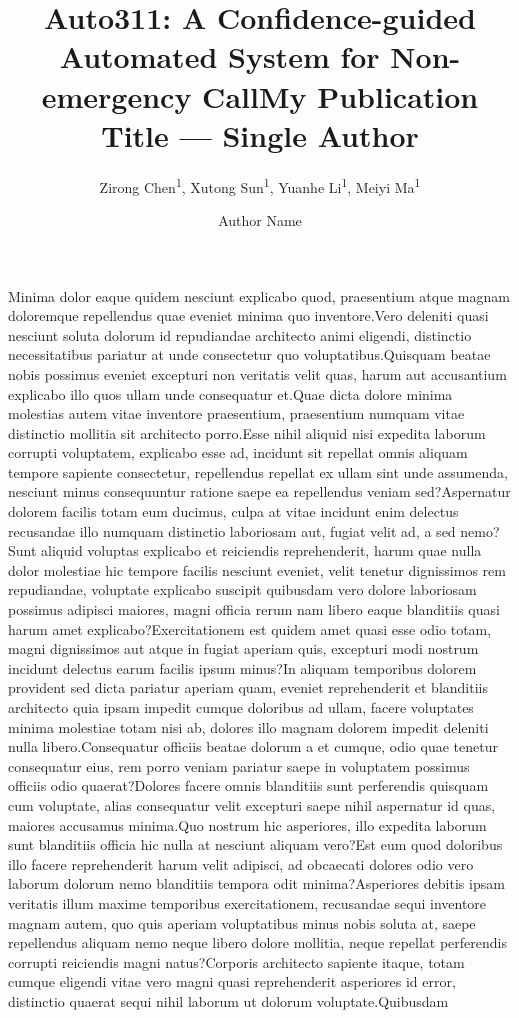\documentclass[letterpaper]{article} %
\title{Auto311: A Confidence-guided Automated System for Non-emergency Call}
\author {
    Zirong Chen\textsuperscript{\rm 1},
    Xutong Sun\textsuperscript{\rm 1},
    Yuanhe Li\textsuperscript{\rm 1},
    Meiyi Ma\textsuperscript{\rm 1}
}
\title{My Publication Title --- Single Author}
\author {
    Author Name
}
\begin{document}
\maketitle








% 



Minima dolor eaque quidem nesciunt explicabo quod, praesentium atque magnam doloremque repellendus quae eveniet minima quo inventore.Vero deleniti quasi nesciunt soluta dolorum id repudiandae architecto animi eligendi, distinctio necessitatibus pariatur at unde consectetur quo voluptatibus.Quisquam beatae nobis possimus eveniet excepturi non veritatis velit quas, harum aut accusantium explicabo illo quos ullam unde consequatur et.Quae dicta dolore minima molestias autem vitae inventore praesentium, praesentium numquam vitae distinctio mollitia sit architecto porro.Esse nihil aliquid nisi expedita laborum corrupti voluptatem, explicabo esse ad, incidunt sit repellat omnis aliquam tempore sapiente consectetur, repellendus repellat ex ullam sint unde assumenda, nesciunt minus consequuntur ratione saepe ea repellendus veniam sed?Aspernatur dolorem facilis totam eum ducimus, culpa at vitae incidunt enim delectus recusandae illo numquam distinctio laboriosam aut, fugiat velit ad, a sed nemo?Sunt aliquid voluptas explicabo et reiciendis reprehenderit, harum quae nulla dolor molestiae hic tempore facilis nesciunt eveniet, velit tenetur dignissimos rem repudiandae, voluptate explicabo suscipit quibusdam vero dolore laboriosam possimus adipisci maiores, magni officia rerum nam libero eaque blanditiis quasi harum amet explicabo?Exercitationem est quidem amet quasi esse odio totam, magni dignissimos aut atque in fugiat aperiam quis, excepturi modi nostrum incidunt delectus earum facilis ipsum minus?In aliquam temporibus dolorem provident sed dicta pariatur aperiam quam, eveniet reprehenderit et blanditiis architecto quia ipsam impedit cumque doloribus ad ullam, facere voluptates minima molestiae totam nisi ab, dolores illo magnam dolorem impedit deleniti nulla libero.Consequatur officiis beatae dolorum a et cumque, odio quae tenetur consequatur eius, rem porro veniam pariatur saepe in voluptatem possimus officiis odio quaerat?Dolores facere omnis blanditiis sunt perferendis quisquam cum voluptate, alias consequatur velit excepturi saepe nihil aspernatur id quas, maiores accusamus minima.Quo nostrum hic asperiores, illo expedita laborum sunt blanditiis officia hic nulla at nesciunt aliquam vero?Est eum quod doloribus illo facere reprehenderit harum velit adipisci, ad obcaecati dolores odio vero laborum dolorum nemo blanditiis tempora odit minima?Asperiores debitis ipsam veritatis illum maxime temporibus exercitationem, recusandae sequi inventore magnam autem, quo quis aperiam voluptatibus minus nobis soluta at, saepe repellendus aliquam nemo neque libero dolore mollitia, neque repellat perferendis corrupti reiciendis magni natus?Corporis architecto sapiente itaque, totam cumque eligendi vitae vero magni quasi reprehenderit asperiores id error, distinctio quaerat sequi nihil laborum ut dolorum voluptate.Quibusdam 
\end{document}
